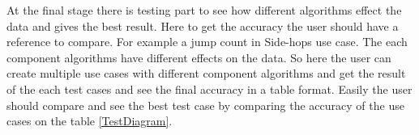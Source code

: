 
At the final stage there is testing  part to see how different algorithms effect the data and gives the best result. Here to get the accuracy the user should have a reference to compare. For example a jump count in Side-hops use case. The each component algorithms have different effects on the data. So here the user can create multiple use cases with different component algorithms and get the result of the each test cases and see the final accuracy in a table format. Easily the user should compare and see the best test case by comparing the accuracy of the use cases on the table \ref{TestDiagram}. 













